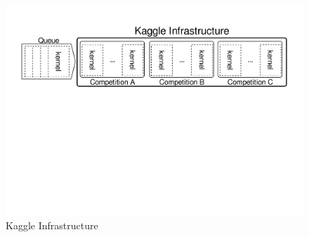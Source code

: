 \begin{figure}
\centering
\includegraphics[width=\columnwidth]{../images/example-use-case}
\caption{Kaggle Infrastructure}
\label{example-use-case}
\end{figure}

